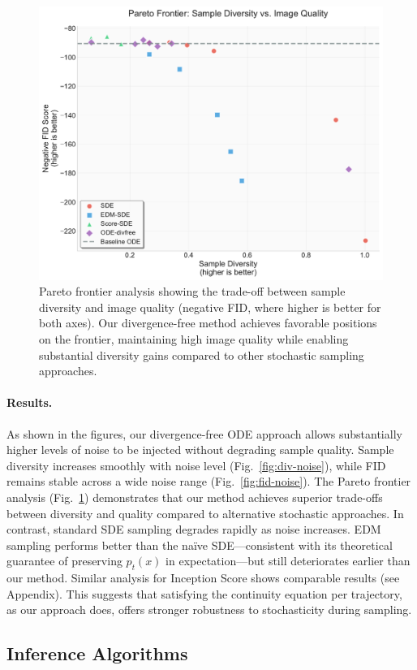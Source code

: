 \documentclass{article}
\begin{document}
\begin{figure}[H]
  \centering
  \includegraphics[width=0.7\linewidth]{figures/pareto_diversity_vs_fid.pdf}
  \caption{Pareto frontier analysis showing the trade-off between sample diversity and image quality (negative FID, where higher is better for both axes). Our divergence-free method achieves favorable positions on the frontier, maintaining high image quality while enabling substantial diversity gains compared to other stochastic sampling approaches.}
  \label{fig:pareto-fid}
\end{figure}

\paragraph{Results.}
As shown in the figures, our divergence-free ODE approach allows substantially higher levels of noise to be injected without degrading sample quality. Sample diversity increases smoothly with noise level (Fig.~\ref{fig:div-noise}), while FID remains stable across a wide noise range (Fig.~\ref{fig:fid-noise}). The Pareto frontier analysis (Fig.~\ref{fig:pareto-fid}) demonstrates that our method achieves superior trade-offs between diversity and quality compared to alternative stochastic approaches. In contrast, standard SDE sampling degrades rapidly as noise increases. EDM sampling performs better than the naïve SDE—consistent with its theoretical guarantee of preserving \(p_t(x)\) in expectation—but still deteriorates earlier than our method. Similar analysis for Inception Score shows comparable results (see Appendix). This suggests that satisfying the continuity equation per trajectory, as our approach does, offers stronger robustness to stochasticity during sampling.

\subsection{Inference Algorithms}
\end{document}
